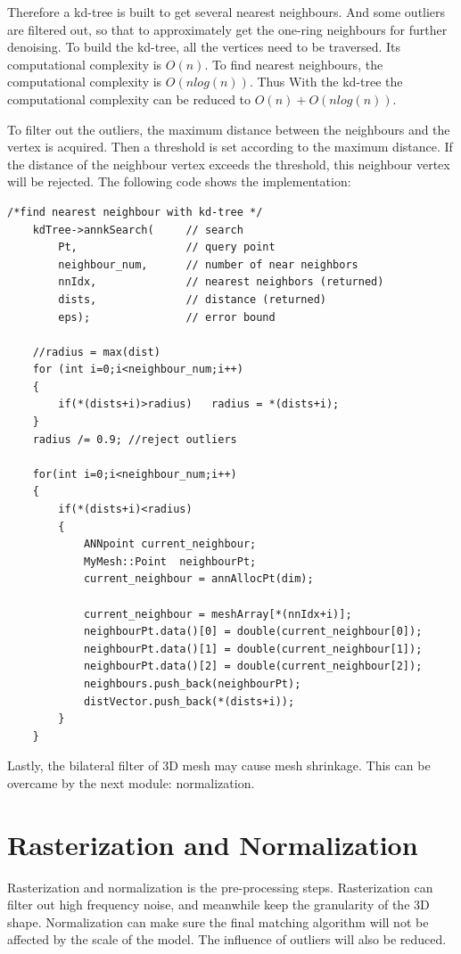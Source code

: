 Therefore a kd-tree is built to get several nearest neighbours. And some outliers are filtered out, so that to approximately get the one-ring neighbours for further denoising. To build the kd-tree, all the vertices need to be traversed. Its computational complexity is $O(n)$. To find nearest neighbours, the computational complexity is $O(nlog(n))$. Thus With the kd-tree the computational complexity can be reduced to $O(n)+O(nlog(n))$.

To filter out the outliers, the maximum distance between the neighbours and the vertex is acquired. Then a threshold is set according to the maximum distance. If the distance of the neighbour vertex exceeds the threshold, this neighbour vertex will be rejected. The following code shows the implementation:

\begin{lstlisting}[xleftmargin=1em]
/*find nearest neighbour with kd-tree */
	kdTree->annkSearch(		// search
		Pt,					// query point
		neighbour_num,      // number of near neighbors
		nnIdx,				// nearest neighbors (returned)
		dists,				// distance (returned)
		eps);				// error bound

	//radius = max(dist)
	for (int i=0;i<neighbour_num;i++)
	{
		if(*(dists+i)>radius)	radius = *(dists+i); 
	}
	radius /= 0.9; //reject outliers

	for(int i=0;i<neighbour_num;i++)
	{
		if(*(dists+i)<radius)
		{
			ANNpoint current_neighbour;
			MyMesh::Point  neighbourPt;
			current_neighbour = annAllocPt(dim);

			current_neighbour = meshArray[*(nnIdx+i)];
			neighbourPt.data()[0] = double(current_neighbour[0]);
			neighbourPt.data()[1] = double(current_neighbour[1]);
			neighbourPt.data()[2] = double(current_neighbour[2]);
			neighbours.push_back(neighbourPt);
			distVector.push_back(*(dists+i));
		}
	}
\end{lstlisting}

Lastly, the bilateral filter of 3D mesh may cause mesh shrinkage. This can be overcame by the next module: normalization. 

\section{Rasterization and Normalization}
Rasterization and normalization is the pre-processing steps. Rasterization can filter out high frequency noise, and meanwhile keep the granularity of the 3D shape. Normalization can make sure the final matching algorithm will not be affected by the scale of the model. The influence of outliers will also be reduced. 

